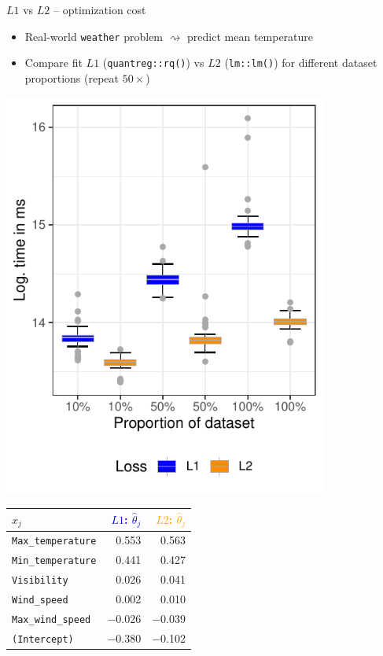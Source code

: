 \documentclass[11pt,compress,t,notes=noshow, xcolor=table]{beamer}
\begin{document}

\begin{vbframe}{$L1$ vs $L2$ -- optimization cost}

\begin{itemize}
    \item Real-world \texttt{weather} problem $\rightsquigarrow$ 
    predict mean temperature
    \item Compare fit $L1$ (\texttt{quantreg::rq()}) vs $L2$ (\texttt{lm::lm()})
    for different dataset proportions (repeat $50\times$)
\end{itemize}

\vfill

\begin{minipage}[c]{0.54\textwidth}
    \centering
    \includegraphics[width=0.8\textwidth]{figure/reg_l1_benchmark.pdf}
\end{minipage}
\scriptsize
\begin{minipage}[c]{0.45\textwidth}
    \begin{tabular}{l|r|r}
        $x_j$ & \textcolor{blue}{$L1$: $\hat \theta_j$}  &
        \textcolor{orange}{$L2$: $\hat \theta_j$} \\ \hline
        \texttt{Max\_temperature} & 0.553 & 0.563 \\
        \texttt{Min\_temperature} & 0.441 & 0.427 \\
        \texttt{Visibility} & 0.026 & 0.041 \\
        \texttt{Wind\_speed} & 0.002 & 0.010 \\
        \texttt{Max\_wind\_speed} & $-$0.026 & $-$0.039 \\
        \texttt{(Intercept)} & $-$0.380 & $-$0.102 \\
    \end{tabular}
    

\end{minipage}
\end{vbframe}
\end{document}
